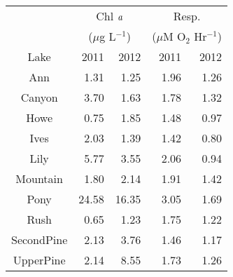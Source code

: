 \begin{table}[ht]
\centering
\begin{tabular}{c r r r r }
  \hline
\hline
  & \multicolumn{2}{c}{Chl $\emph{a}$} & 
                      \multicolumn{2}{c}{Resp.} \\
 & \multicolumn{2}{c}{($\mu$g L$^{-1}$)} & 
                      \multicolumn{2}{c}{($\mu$M O$_2$ Hr$^{-1}$)} \\
 Lake & 2011 & 2012 & 2011 & 2012 \\
 \hline
Ann & 1.31 & 1.25 & 1.96 & 1.26 \\ 
  Canyon & 3.70 & 1.63 & 1.78 & 1.32 \\ 
  Howe & 0.75 & 1.85 & 1.48 & 0.97 \\ 
  Ives & 2.03 & 1.39 & 1.42 & 0.80 \\ 
  Lily & 5.77 & 3.55 & 2.06 & 0.94 \\ 
  Mountain & 1.80 & 2.14 & 1.91 & 1.42 \\ 
  Pony & 24.58 & 16.35 & 3.05 & 1.69 \\ 
  Rush & 0.65 & 1.23 & 1.75 & 1.22 \\ 
  SecondPine & 2.13 & 3.76 & 1.46 & 1.17 \\ 
  UpperPine & 2.14 & 8.55 & 1.73 & 1.26 \\ 
   \hline
\end{tabular}
\end{table}

